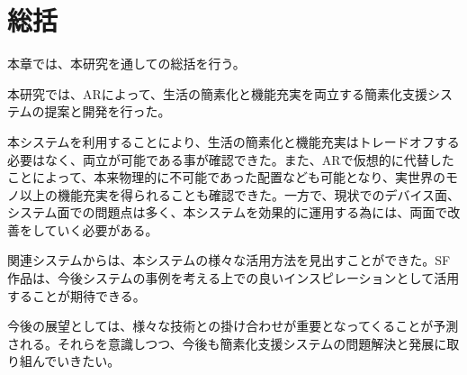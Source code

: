 
\chapter{総括}
\label{chap:summary}

本章では、本研究を通しての総括を行う。

\newpage

本研究では、ARによって、生活の簡素化と機能充実を両立する簡素化支援システムの提案と開発を行った。

本システムを利用することにより、生活の簡素化と機能充実はトレードオフする必要はなく、両立が可能である事が確認できた。また、ARで仮想的に代替したことによって、本来物理的に不可能であった配置なども可能となり、実世界のモノ以上の機能充実を得られることも確認できた。一方で、現状でのデバイス面、システム面での問題点は多く、本システムを効果的に運用する為には、両面で改善をしていく必要がある。

関連システムからは、本システムの様々な活用方法を見出すことができた。SF作品は、今後システムの事例を考える上での良いインスピレーションとして活用することが期待できる。

今後の展望としては、様々な技術との掛け合わせが重要となってくることが予測される。それらを意識しつつ、今後も簡素化支援システムの問題解決と発展に取り組んでいきたい。
